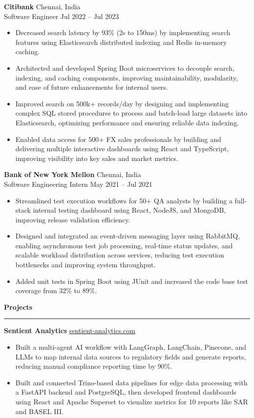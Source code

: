 \documentclass[10pt]{article}
\newcommand{\resumeSection}[1]{{\large\textbf{#1}}\par\vspace{0.18em}\hrule\vspace{0.4em}}
\newcommand{\resumeEntry}[4]{
  \textbf{#1} \hfill #2 \\
  #3 \hfill #4 \\
}
\begin{document}
\resumeEntry{Citibank}{Chennai, India}{Software Engineer}{Jul 2022 -- Jul 2023}
\begin{itemize}
\item Decreased search latency by 93\% (2s to 150ms) by implementing search features using Elasticsearch distributed indexing and Redis in-memory caching.
\item Architected and developed Spring Boot microservices to decouple search, indexing, and caching components, improving maintainability, modularity, and ease of future enhancements for internal users.
\item Improved search on 500k+ records/day by designing and implementing complex SQL stored procedures to process and batch-load large datasets into Elasticsearch, optimizing performance and ensuring reliable data indexing.
\item Enabled data access for 500+ FX sales professionals by building and delivering multiple interactive dashboards using React and TypeScript, improving visibility into key sales and market metrics.
\end{itemize}

\resumeEntry{Bank of New York Mellon}{Chennai, India}{Software Engineering Intern}{May 2021 -- Jul 2021}
\begin{itemize}
\item Streamlined test execution workflows for 50+ QA analysts by building a full-stack internal testing dashboard using React, NodeJS, and MongoDB, improving release validation efficiency.
\item Designed and integrated an event-driven messaging layer using RabbitMQ, enabling asynchronous test job processing, real-time status updates, and scalable workload distribution across services, reducing test execution bottlenecks and improving system throughput.
\item Added unit tests in Spring Boot using JUnit and increased the code base test coverage from 32\% to 89\%.
\end{itemize}

\resumeSection{Projects}
\textbf{Sentient Analytics} \hfill \href{https://sentient-analytics.com}{sentient-analytics.com} \\
\begin{itemize}
\item Built a multi-agent AI workflow with LangGraph, LangChain, Pinecone, and LLMs to map internal data sources to regulatory fields and generate reports, reducing manual compliance reporting time by 90\%.
\item Built and connected Trino-based data pipelines for edge data processing with a FastAPI backend and PostgreSQL, then developed frontend dashboards using React and Apache Superset to visualize metrics for 10 reports like SAR and BASEL III.
\end{itemize}
\end{document}
